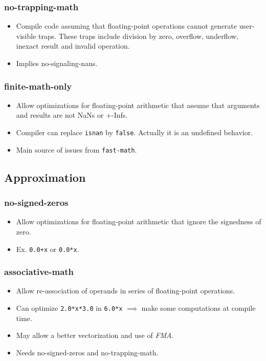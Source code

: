 \documentclass{beamer}
\begin{document}
\begin{frame}[fragile]
    \frametitle{no-trapping-math}

    \begin{itemize}
        \item Compile code assuming that floating-point operations cannot generate user-visible traps.
              These traps include division by zero, overflow, underflow, inexact result and invalid operation.
        \item Implies no-signaling-nans.
    \end{itemize}
\end{frame}

\begin{frame}[fragile]
    \frametitle{finite-math-only}

    \begin{itemize}
        \item Allow optimizations for floating-point arithmetic that assume that arguments and results are not NaNs or +-Infs.
        \item Compiler can replace \verb'isnan' by \verb'false'.
              Actually it is an undefined behavior.
        \item Main source of issues from \verb'fast-math'.
    \end{itemize}
\end{frame}

\subsection{Approximation}

\begin{frame}[fragile]
    \frametitle{no-signed-zeros}

    \begin{itemize}
        \item Allow optimizations for floating-point arithmetic that ignore the signedness of zero.
        \item Ex. \verb'0.0+x' or \verb'0.0*x'.
    \end{itemize}
\end{frame}

\begin{frame}[fragile]
    \frametitle{associative-math}

    \begin{itemize}
        \item Allow re-association of operands in series of floating-point operations.
        \item Can optimize \verb'2.0*x*3.0' in \verb'6.0*x' $\implies$ make some computations at compile time.
        \item May allow a better vectorization and use of \emph{FMA}.
        \item Needs no-signed-zeros and no-trapping-math.
    \end{itemize}
\end{frame}
\end{document}
